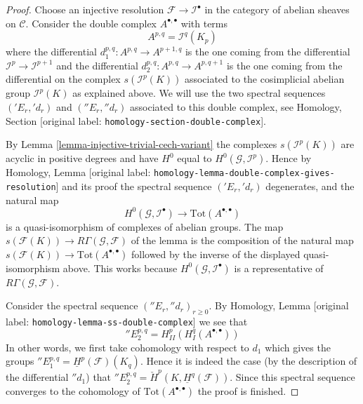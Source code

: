 \documentclass[10pt,a4paper]{article}
\theoremstyle{plain}
\theoremstyle{definition}
\theoremstyle{remark}
\numberwithin{equation}{subsection}
\begin{document}
\begin{proof}
Choose an injective resolution $\mathcal{F} \to \mathcal{I}^\bullet$
in the category of abelian sheaves on $\mathcal{C}$. Consider the
double complex $A^{\bullet, \bullet}$ with terms
$$
A^{p, q} = \mathcal{I}^q(K_p)
$$
where the differential $d_1^{p, q} : A^{p, q} \to A^{p + 1, q}$
is the one coming from the differential $\mathcal{I}^p \to \mathcal{I}^{p + 1}$
and the differential $d_2^{p, q} : A^{p, q} \to A^{p, q + 1}$ is the
one coming from the differential on the complex
$s(\mathcal{I}^p(K))$ associated to the cosimplicial abelian group
$\mathcal{I}^p(K)$ as explained above.
We will use the two spectral
sequences $({}'E_r, {}'d_r)$ and $({}''E_r, {}''d_r)$
associated to this double complex, see
Homology, Section \textnormal{[original label: \nolinkurl{homology-section-double-complex}]}.

\medskip\noindent
By Lemma \ref{lemma-injective-trivial-cech-variant} the complexes
$s(\mathcal{I}^p(K))$ are acyclic in positive degrees and have
$H^0$ equal to $H^0(\mathcal{G}, \mathcal{I}^p)$. Hence by
Homology, Lemma \textnormal{[original label: \nolinkurl{homology-lemma-double-complex-gives-resolution}]}
and its proof the spectral sequence $({}'E_r, {}'d_r)$ degenerates,
and the natural map
$$
H^0(\mathcal{G}, \mathcal{I}^\bullet) \longrightarrow
\text{Tot}(A^{\bullet, \bullet})
$$
is a quasi-isomorphism of complexes of abelian groups. The map
$s(\mathcal{F}(K)) \longrightarrow R\Gamma(\mathcal{G}, \mathcal{F})$
of the lemma is the composition of the natural map
$s(\mathcal{F}(K)) \to \text{Tot}(A^{\bullet, \bullet})$
followed by the inverse of the displayed quasi-isomorphism above.
This works because $H^0(\mathcal{G}, \mathcal{I}^\bullet)$
is a representative of $R\Gamma(\mathcal{G}, \mathcal{F})$.

\medskip\noindent
Consider the spectral sequence $({}''E_r, {}''d_r)_{r \geq 0}$. By
Homology, Lemma \textnormal{[original label: \nolinkurl{homology-lemma-ss-double-complex}]}
we see that
$$
{}''E_2^{p, q} = H^p_{II}(H^q_I(A^{\bullet, \bullet}))
$$
In other words, we first take cohomology with respect to
$d_1$ which gives the groups
${}''E_1^{p, q} = \underline{H}^p(\mathcal{F})(K_q)$.
Hence it is indeed the case (by the description of the differential
${}''d_1$) that
${}''E_2^{p, q} = \check{H}^p(K, \underline{H}^q(\mathcal{F}))$.
Since this spectral sequence converges to the cohomology of
$\text{Tot}(A^{\bullet, \bullet})$ the proof is finished.
\end{proof}
\end{document}
